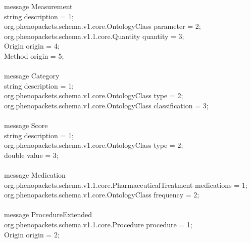 \documentclass[a4paper, 10pt]{article}
\begin{document}
message \colorbox{yellow!80}{Measurement} \ {\\
    string description = 1; \\
    org.phenopackets.schema.v1.core.OntologyClass parameter = 2; \\
    org.phenopackets.schema.v1.1.core.Quantity quantity = 3; \\
    \colorbox{yellow!80}{Origin} origin = 4; \\
      \colorbox{yellow!80}{Method} origin = 5; \\
\ } \\




message \colorbox{yellow!80}{Category} \ { \\
    string description = 1; \\
    org.phenopackets.schema.v1.core.OntologyClass type = 2; \\
    org.phenopackets.schema.v1.core.OntologyClass classification = 3; \\
\ } \\




message \colorbox{yellow!80}{Score} \ { \\
    string description = 1; \\
    org.phenopackets.schema.v1.core.OntologyClass type = 2; \\
    double value = 3; \\
\ } \\




message \colorbox{yellow!80}{Medication} \ { \\
    org.phenopackets.schema.v1.1.core.PharmaceuticalTreatment medications = 1; \\
    org.phenopackets.schema.v1.core.OntologyClass frequency = 2; \\
\ } \\




message \colorbox{yellow!80}{ProcedureExtended} \ { \\
    org.phenopackets.schema.v1.1.core.Procedure procedure = 1; \\
    Origin origin = 2; \\
\ } \\
\end{document}
